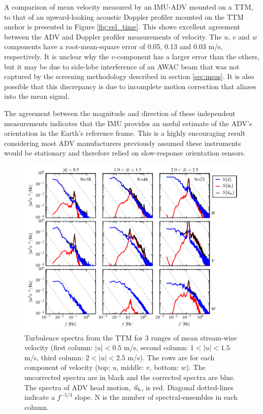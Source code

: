 \documentclass[twocol]{ametsoc}
\begin{document}
A comparison of mean velocity measured by an IMU-ADV mounted on a TTM, to that of an upward-looking acoustic Doppler profiler mounted on the TTM anchor is presented in Figure \ref{fig:vel_time}. This shows excellent agreement between the ADV and Doppler profiler measurements of velocity. The $u$, $v$ and $w$ components have a root-mean-square error of 0.05, 0.13 and 0.03 m/s, respectively. 
It is unclear why the $v$-component has a larger error than the others, but it may be due to side-lobe interference of an AWAC beam that was not captured by the screening methodology described in section \ref{sec:meas}. It is also possible that this discrepancy is due to incomplete motion correction that aliases into the mean signal.

The agreement between the magnitude and direction of these independent measurements indicates that the IMU provides an useful estimate of the ADV's orientation in the Earth's reference frame. This is a highly encouraging result considering most ADV manufacturers previously assumed these instruments would be stationary and therefore relied on slow-response orientation sensors.

\begin{figure}[t]
  \centering
  \includegraphics{SpecFig02_TTM02B-top}
  \caption{Turbulence spectra from the TTM for 3 ranges of mean stream-wise velocity (first column: $|u|< 0.5$ m/s, second column: $1 < |u| < 1.5$ m/s, third column: $2 < |u| < 2.5$ m/s). The rows are for each component of velocity (top: $u$, middle: $v$, bottom: $w$). The uncorrected spectra are in black and the corrected spectra are blue. The spectra of ADV head motion, $\vec{u}_\mathrm{h}$, is red. Diagonal dotted-lines indicate a $f^{-5/3}$ slope. N is the number of spectral-ensembles in each column.}
  \label{fig:spec01}
\end{figure}
\end{document}
